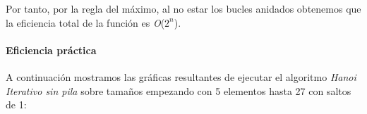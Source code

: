 \documentclass[a4paper,12pt]{article} %
\begin{document}
Por tanto, por la regla del máximo, al no estar los bucles anidados obtenemos que la eficiencia total de la función es \textit{O}($2^n$).\\

\paragraph{Eficiencia práctica}

A continuación mostramos las gráficas resultantes de ejecutar el algoritmo \textit{Hanoi Iterativo sin pila}
sobre tamaños empezando con 5 elementos hasta 27 con saltos de 1:

\begin{table}[H]
	\centering
\end{table}
\end{document}
